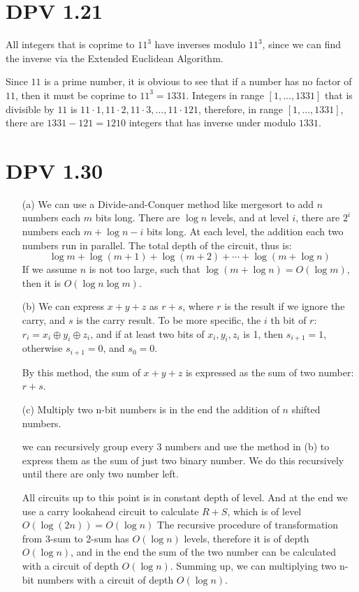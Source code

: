 \documentclass[twoside]{homework}
\begin{document}
\section{DPV 1.21}
All integers that is coprime to $11^3$ have inverses modulo $11^3$, since we can find the inverse via the Extended Euclidean Algorithm.

Since $11$ is a prime number, it is obvious to see that if a number has no factor of $11$, then it must be coprime to $11^3=1331$. Integers in range $[1,...,1331]$ that is divisible by $11$ is $11\cdot 1, 11\cdot 2, 11\cdot 3, ..., 11\cdot 121$, therefore, in range $[1,...,1331]$, there are $1331-121=1210$ integers that has inverse under modulo $1331$.


\section{DPV 1.30}
\begin{enumerate}
	\item [(a)] We can use a Divide-and-Conquer method like mergesort to add $n$ numbers each $m$ bits long. There are $\log n$ levels, and at level $i$, there are $2^i$ numbers each $m + \log n - i$ bits long. At each level, the addition each two numbers run in parallel. The total depth of the circuit, thus is:
	\[\log m + \log (m+1) + \log (m+2) + \cdots + \log (m + \log n)\]
	If we assume $n$ is not too large, such that $\log(m+\log n) = O(\log m)$, then it is $O(\log n \log m)$.

	\item [(b)] We can express $x + y + z$ as $r+s$, where $r$ is the result if we ignore the carry, and $s$ is the carry result. To be more specific, the $i$ th bit of $r$: $r_i = x_i \oplus y_i \oplus z_i $, and if at least two bits of $x_i, y_i, z_i$ is 1, then $s_{i+1} = 1$, otherwise $s_{i+1} = 0$, and $s_0 = 0$.

	By this method, the sum of $x+y+z$ is expressed as the sum of two number: $r+s$.

	\item [(c)]
	Multiply two n-bit numbers is in the end the addition of $n$ shifted numbers.

	we can recursively group every 3 numbers and use the method in (b) to express them as the sum of just two binary number. We do this recursively until there are only two number left.

	All circuits up to this point is in constant depth of level. And at the end we use a carry lookahead circuit to calculate $R+S$, which is of level $O(\log (2n)) = O(\log n)$
	The recursive procedure of transformation from 3-sum to 2-sum has $O(\log n)$ levels, therefore it is of depth $O(\log n)$, and in the end the sum of the two number can be calculated with a circuit of depth $O(\log n)$. Summing up, we can multiplying two n-bit numbers with a circuit of depth $O(\log n)$.
\end{enumerate}
\end{document}
